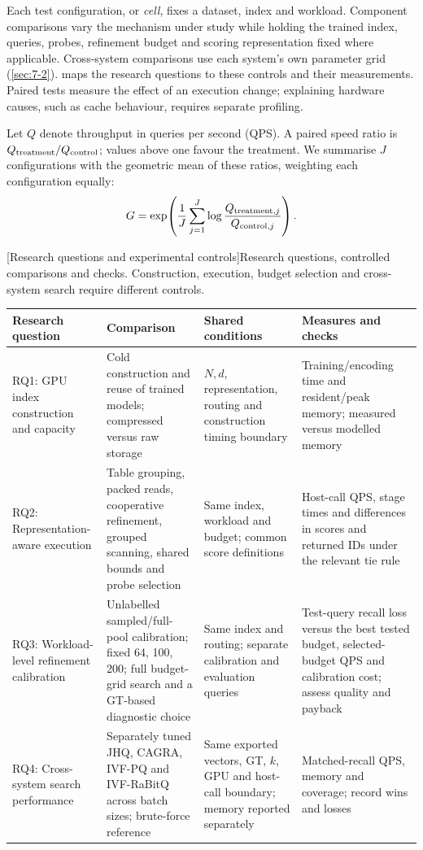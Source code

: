 Each test configuration, or \emph{cell}, fixes a dataset, index and
workload. Component comparisons vary the mechanism under study while
holding the trained index, queries, probes, refinement budget and scoring
representation fixed where applicable. Cross-system comparisons use each
system's own parameter grid (\cref{sec:7-2}).  maps the
research questions to these controls and their measurements. Paired tests
measure the effect of an execution change; explaining hardware causes,
such as cache behaviour, requires separate profiling.

Let $Q$ denote throughput in queries per second (QPS). A paired speed
ratio is $Q_{\rm treatment}/Q_{\rm control}$; values above one favour
the treatment. We summarise $J$ configurations with the geometric mean
of these ratios, weighting each configuration equally:
\[
 G=\exp\!\left(\frac1J\sum_{j=1}^{J}
 \log\frac{Q_{{\rm treatment},j}}{Q_{{\rm control},j}}\right).
\]

\par\medskip\noindent\begin{minipage}{\linewidth}
\centering\captionsetup{hypcap=false}
[Research questions and experimental controls]{Research questions, controlled comparisons and checks. Construction,
execution, budget selection and cross-system search require different controls.}
\label{tab:3-design}
\footnotesize\setlength{\tabcolsep}{3pt}
\begin{tabularx}{\linewidth}{@{}>{\raggedright\arraybackslash}p{.19\linewidth}*{3}{>{\raggedright\arraybackslash}X}@{}}
\toprule
Research question & Comparison & Shared conditions & Measures and checks \\
\midrule
RQ1: GPU index construction and capacity & Cold construction and reuse of trained models; compressed versus raw storage
& $N,d$, representation, routing and construction timing boundary
& Training/encoding time and resident/peak memory; measured versus modelled memory \\
RQ2: Representation-aware execution & Table grouping, packed reads, cooperative refinement, grouped scanning, shared bounds and probe selection
& Same index, workload and budget; common score definitions
& Host-call QPS, stage times and differences in scores and returned IDs under the relevant tie rule \\
RQ3: Workload-level refinement calibration & Unlabelled sampled/full-pool calibration; fixed 64, 100, 200; full budget-grid search and a GT-based diagnostic choice
& Same index and routing; separate calibration and evaluation queries
& Test-query recall loss versus the best tested budget, selected-budget QPS and calibration cost; assess quality and payback \\
RQ4: Cross-system search performance & Separately tuned JHQ, CAGRA, IVF-PQ and IVF-RaBitQ across batch sizes; brute-force reference
& Same exported vectors, GT, $k$, GPU and host-call boundary; memory reported separately
& Matched-recall QPS, memory and coverage; record wins and losses \\
\bottomrule
\end{tabularx}
\end{minipage}\par\medskip
